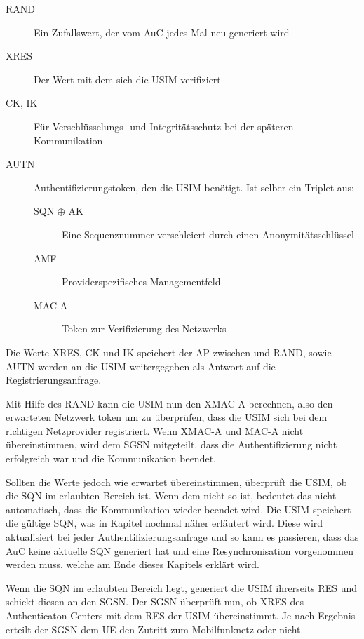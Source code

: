  \begin{description}
  \item [RAND] Ein Zufallswert, der vom AuC jedes Mal neu generiert wird
  \item [XRES] Der Wert mit dem sich die USIM verifiziert
  \item [CK, IK] Für Verschlüsselungs- und Integritätsschutz bei der späteren Kommunikation
  \item [AUTN] Authentifizierungstoken, den die USIM benötigt. Ist selber ein Triplet aus:
  \begin{description}
   \item [SQN $\oplus$ AK] Eine Sequenznummer verschleiert durch einen Anonymitätsschlüssel
   \item [AMF] Providerspezifisches Managementfeld
   \item [MAC-A] Token zur Verifizierung des Netzwerks
  \end{description}
 \end{description}
 
 Die Werte XRES, CK und IK speichert der AP zwischen und RAND, sowie AUTN werden an die USIM
 weitergegeben als Antwort auf die Registrierungsanfrage.

 Mit Hilfe des RAND kann die USIM nun den XMAC-A berechnen, also den erwarteten Netzwerk\-
 token um zu überprüfen, dass die USIM sich bei dem richtigen Netzprovider registriert. Wenn XMAC-A
 und MAC-A nicht übereinstimmen, wird dem SGSN mitgeteilt, dass die Authentifizierung nicht erfolgreich
 war und die Kommunikation beendet.

 Sollten die Werte jedoch wie erwartet übereinstimmen, überprüft die USIM, ob die SQN im erlaubten
 Bereich ist. Wenn dem nicht so ist, bedeutet das nicht automatisch, dass die Kommunikation wieder
 beendet wird. Die USIM speichert die gültige SQN, was in Kapitel 
 nochmal näher erläutert wird. Diese wird aktualisiert bei jeder Authentifizierungsanfrage und so kann
 es passieren, dass das AuC keine aktuelle SQN generiert hat und eine Resynchronisation vorgenommen
 werden muss, welche am Ende dieses Kapitels erklärt wird.
 
 Wenn die SQN im erlaubten Bereich liegt, generiert die USIM ihrerseits RES und schickt diesen an
 den SGSN. Der SGSN überprüft nun, ob XRES des Authenticaton Centers mit dem RES der USIM
 übereinstimmt. Je nach Ergebnis erteilt der SGSN dem \ac{UE} den Zutritt zum Mobilfunknetz oder
 nicht.
 
